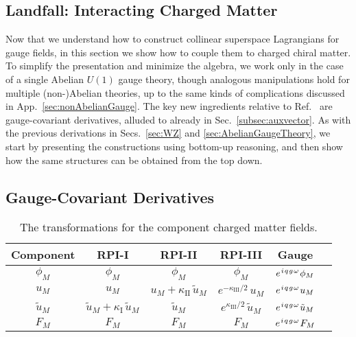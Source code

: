 \documentclass[12pt,document,nofootinbib,superscriptaddress,onecolumn,preprintnumbers,balancelastpage]{article}
\newcommand{\rpii}{{\kappa_\text{I}}}
\newcommand{\rpiii}{{\kappa_\text{II}}}
\newcommand{\rpiiii}{{\kappa_\text{III}}}
\newcommand{\s}{\hspace{0.8pt}}
\DeclareRobustCommand{\Sec}[1]{Sec.~\ref{#1}}
\DeclareRobustCommand{\Secs}[2]{Secs.~\ref{#1} and \ref{#2}}
\DeclareRobustCommand{\App}[1]{App.~\ref{#1}}
\DeclareRobustCommand{\Ref}[1]{Ref.~\cite{#1}}
\begin{document}
\begin{spacing}{1.2}
\section{Landfall: Interacting Charged Matter}
\label{sec:Landfall}


Now that we understand how to construct collinear superspace Lagrangians for gauge fields, in this section we show how to couple them to charged chiral matter.
%
To simplify the presentation and minimize the algebra, we work only in the case of a single Abelian $U(1)$ gauge theory, though analogous manipulations hold for multiple (non-)Abelian theories, up to the same kinds of complications discussed in \App{sec:nonAbelianGauge}.
%
The key new ingredients relative to \Ref{Cohen:2018qvn} are gauge-covariant derivatives, alluded to already in \Sec{subsec:auxvector}.
%
As with the previous derivations in \Secs{sec:WZ}{sec:AbelianGaugeTheory}, we start by presenting the constructions using bottom-up reasoning, and then show how the same structures can be obtained from the top down.


\subsection{Gauge-Covariant Derivatives}
\label{subsec:gaugecovderiv}


\begin{table}[t]
\renewcommand{\arraystretch}{1.8}
\setlength{\arrayrulewidth}{.3mm}
\centering
\small
\setlength{\tabcolsep}{0.35 em}
 \begin{tabular}{ |c || c | c | c | c | c|}
 \hline
     Component & RPI-I &  RPI-II &  RPI-III  & Gauge    \\ \hline \hline
     $\phi_M$ & $\phi_M$  & $\phi_M$  & $\phi_M$ &  $e^{\s i\s q\s g\s \omega} \s \phi_M $ \\ 
     $u_M$ & $u_M$ & $ u_M + \rpiii \,\tilde{u}_M$  &  $ e^{-\rpiiii/2}\,u_M $& $e^{\s i\s q\s g\s \omega}\s  u_M$ \\ 
     $\tilde{u}_M$ & $\tilde{u}_M + \rpii \, \tilde{u}_M$ & $ \tilde{u}_M$  &  $ e^{\rpiiii/2}\,\tilde{u}_M $& $e^{\s i\s q\s g\s \omega}\s  \tilde{u}_M$ \\ 
     $F_M$ & $F_M$ & $ F_M $  &  $ F_M $& $e^{\s i\s q\s g\s \omega}\s  F_M$ \\ \hline
\end{tabular}
\caption{The transformations for the component charged matter fields. 
}
\label{Table:transComp}
\end{table}


\end{spacing}
\end{document}
